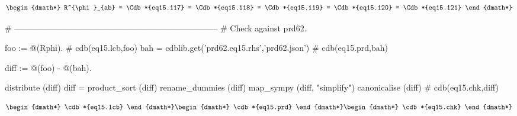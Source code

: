 \documentclass[12pt]{cdblatex}
\begin{document}
\begin{dgroup*}[spread=5pt]
   \begin{dmath*}
      R^{\phi}_{ab}
         = \Cdb*{eq15.117}
         = \Cdb*{eq15.118}
         = \Cdb*{eq15.119}
         = \Cdb*{eq15.120}
         = \Cdb*{eq15.121}
   \end{dmath*}
\end{dgroup*}

\clearpage

\begin{cadabra}
   # --------------------------------------------------------------------------
   # Check against prd62.

   foo := @(Rphi).                                      # cdb(eq15.lcb,foo)
   bah  = cdblib.get('prd62.eq15.rhs','prd62.json')     # cdb(eq15.prd,bah)

   diff := @(foo) - @(bah).

   distribute     (diff)
   diff = product_sort (diff)
   rename_dummies (diff)
   map_sympy      (diff, "simplify")
   canonicalise   (diff)                                # cdb(eq15.chk,diff)
\end{cadabra}


\begin{dgroup*}
   \begin{dmath*} \cdb*{eq15.lcb} \end{dmath*}
   \begin{dmath*} \cdb*{eq15.prd} \end{dmath*}
   \begin{dmath*} \cdb*{eq15.chk} \end{dmath*}
\end{dgroup*}
\end{document}
